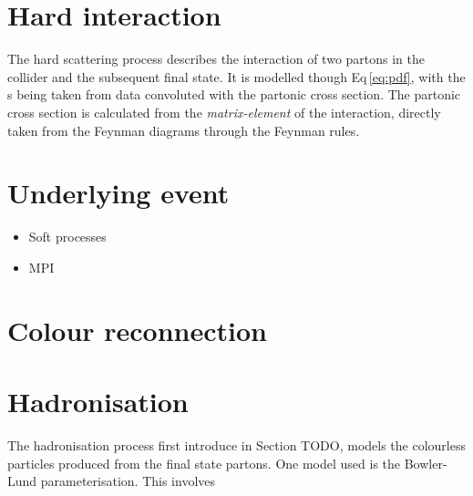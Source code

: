 \section{Hard interaction} %
\label{sub:hard_interaction}
The hard scattering process describes the interaction of two partons in the collider and the subsequent final state. 
It is modelled though Eq\,\ref{eq:pdf}, with the \PDF{}s being taken from data convoluted with the partonic cross section.
The partonic cross section is calculated from the \textit{matrix-element} of the interaction, directly taken from the Feynman diagrams through the Feynman rules.

\section{Underlying event} %
\label{sub:underlying_event}
\begin{itemize}
	\item Soft processes
	\item MPI
\end{itemize}


\section{Colour reconnection} %
\label{sub:colour_reconnection}

\section{Hadronisation} %
\label{sub:hadronisation}

The hadronisation process first introduce in Section TODO, models the colourless particles produced from the final state partons.
One model used is the Bowler-Lund parameterisation.
This involves

